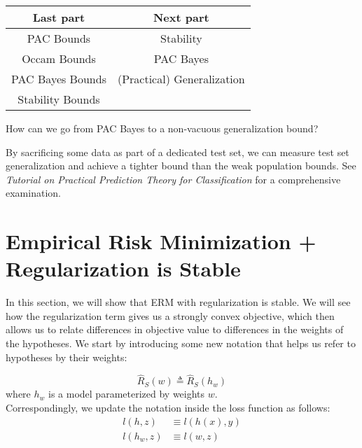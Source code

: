 \documentclass{article}
\begin{document}
\begin{table}[h!]
\centering
\begin{tabular}{|c  | c|} 
 \hline
 \rowcolor{\shadethmcolor}
 \textbf{Last part} & \textbf{Next part} \\ [0.5ex] 
 \hline
 PAC Bounds &  Stability \\
 Occam Bounds & PAC Bayes \\
 PAC Bayes Bounds & (Practical) Generalization \\
 Stability Bounds &  \\
\hline
\end{tabular}
\end{table}

How can we go from PAC Bayes to a non-vacuous generalization bound?

\vspace{0.3cm}
By sacrificing some data as part of a dedicated test set, we can measure test set generalization and achieve a tighter bound than the weak population bounds.  See \textit{Tutorial on Practical Prediction Theory for Classification} \cite{Langford:2005:TPP:1046920.1058111} for a comprehensive examination.

\section*{Empirical Risk Minimization + Regularization is Stable}

In this section, we will show that ERM with regularization is stable. We will see how the regularization term gives us a strongly convex objective, which then allows us to relate differences in objective value to differences in the weights of the hypotheses. We start by introducing some new notation that helps us refer to hypotheses by their weights: 

$$\hat{R}_S(w) \triangleq \hat{R}_S(h_w)$$ where $h_w$ is a model parameterized by weights $w$. \\

Correspondingly, we update the notation inside the loss function as follows:
\begin{align*}
    l(h,z)&\equiv l(h(x), y) \\
    l(h_w, z) &\equiv l(w,z)
\end{align*}
\end{document}
